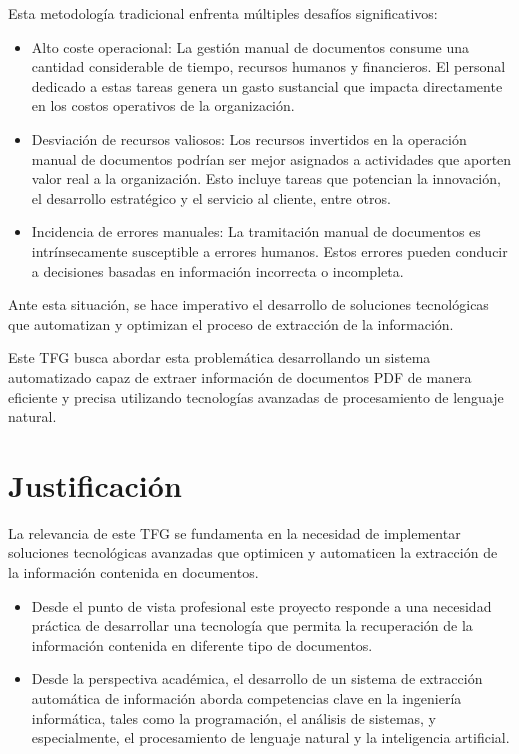 Esta metodología tradicional enfrenta múltiples desafíos significativos:

\begin{itemize}
    \item Alto coste operacional: La gestión manual de documentos consume una cantidad considerable de tiempo, recursos
    humanos y financieros.
    El personal dedicado a estas tareas genera un gasto sustancial que impacta directamente en los costos operativos de
    la organización.
    \item Desviación de recursos valiosos: Los recursos invertidos en la operación manual de documentos podrían ser
    mejor asignados a actividades que aporten valor real a la organización.
    Esto incluye tareas que potencian la innovación, el desarrollo estratégico y el servicio al cliente, entre otros.
    \item Incidencia de errores manuales: La tramitación manual de documentos es intrínsecamente susceptible a errores
    humanos.
    Estos errores pueden conducir a decisiones basadas en información incorrecta o incompleta.
\end{itemize}

Ante esta situación, se hace imperativo el desarrollo de soluciones tecnológicas que automatizan y optimizan el proceso
de extracción de la información.

Este TFG busca abordar esta problemática desarrollando un sistema automatizado capaz de extraer información de
documentos PDF de manera eficiente y precisa utilizando tecnologías avanzadas de procesamiento de lenguaje natural.



\section{Justificación}
La relevancia de este TFG se fundamenta en la necesidad de implementar soluciones tecnológicas avanzadas que optimicen y
automaticen la extracción de la información contenida en documentos.


\begin{itemize}
    \item
    Desde el punto de vista profesional este proyecto responde a una necesidad práctica de desarrollar una tecnología
    que permita la recuperación de la información contenida en diferente tipo de documentos.
    \item Desde la perspectiva académica, el desarrollo de un sistema de extracción automática de información aborda
    competencias clave en la ingeniería informática, tales como la programación, el análisis de sistemas, y
    especialmente, el procesamiento de lenguaje natural y la inteligencia artificial.
\end{itemize}

